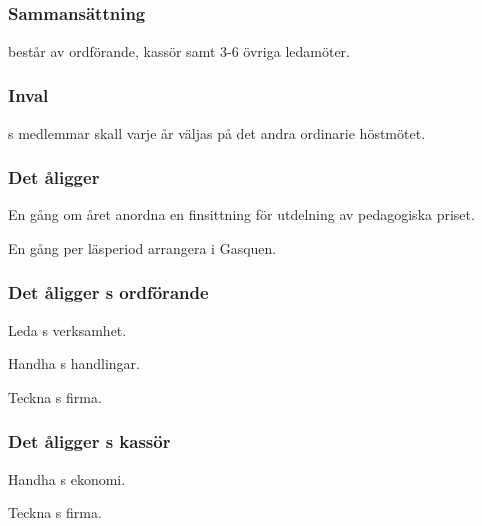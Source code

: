 \subsection{\SEXITFULL}
\subsubsection{Sammansättning}
\SEXIT{} består av ordförande, kassör samt 3-6 övriga ledamöter.

\subsubsection{Inval}
\SEXIT{}s medlemmar skall varje år väljas på det andra ordinarie höstmötet.

\subsubsection{Det åligger \SEXIT}
\begin{att}
	\item En gång om året anordna en finsittning för utdelning av pedagogiska priset.
	\item En gång per läsperiod arrangera i Gasquen. 
\end{att}

\subsubsection{Det åligger \SEXIT{}s ordförande}
\begin{att}
	\item Leda \SEXIT{}s verksamhet.
	\item Handha \SEXIT{}s handlingar.
	\item Teckna \SEXIT{}s firma.
\end{att}

\subsubsection{Det åligger \SEXIT{}s kassör}
\begin{att}
	\item Handha \SEXIT{}s ekonomi.
	\item Teckna \SEXIT{}s firma.
\end{att}
